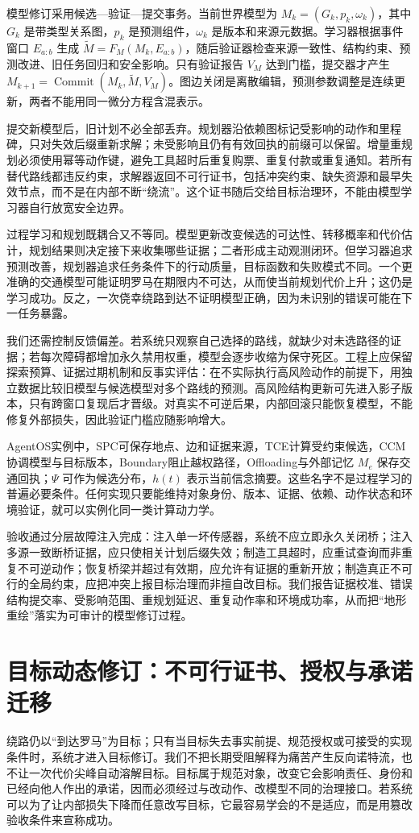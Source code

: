 模型修订采用候选—验证—提交事务。当前世界模型为 $M_k=(G_k,p_k,\omega_k)$，其中 $G_k$ 是带类型关系图，$p_k$ 是预测组件，$\omega_k$ 是版本和来源元数据。学习器根据事件窗口 $E_{a:b}$ 生成 $\widetilde M=F_M(M_k,E_{a:b})$，随后验证器检查来源一致性、结构约束、预测改进、旧任务回归和安全影响。只有验证报告 $V_M$ 达到门槛，提交器才产生 $M_{k+1}=\operatorname{Commit}(M_k,\widetilde M,V_M)$。图边关闭是离散编辑，预测参数调整是连续更新，两者不能用同一微分方程含混表示。

提交新模型后，旧计划不必全部丢弃。规划器沿依赖图标记受影响的动作和里程碑，只对失效后缀重新求解；未受影响且仍有有效回执的前缀可以保留。增量重规划必须使用幂等动作键，避免工具超时后重复购票、重复付款或重复通知。若所有替代路线都违反约束，求解器返回不可行证书，包括冲突约束、缺失资源和最早失效节点，而不是在内部不断“绕流”。这个证书随后交给目标治理环，不能由模型学习器自行放宽安全边界。

过程学习和规划既耦合又不等同。模型更新改变候选的可达性、转移概率和代价估计，规划结果则决定接下来收集哪些证据；二者形成主动观测闭环。但学习器追求预测改善，规划器追求任务条件下的行动质量，目标函数和失败模式不同。一个更准确的交通模型可能证明罗马在期限内不可达，从而使当前规划代价上升；这仍是学习成功。反之，一次侥幸绕路到达不证明模型正确，因为未识别的错误可能在下一任务暴露。

我们还需控制反馈偏差。若系统只观察自己选择的路线，就缺少对未选路径的证据；若每次障碍都增加永久禁用权重，模型会逐步收缩为保守死区。工程上应保留探索预算、证据过期机制和反事实评估：在不实际执行高风险动作的前提下，用独立数据比较旧模型与候选模型对多个路线的预测。高风险结构更新可先进入影子版本，只有跨窗口复现后才晋级。对真实不可逆后果，内部回滚只能恢复模型，不能修复外部损失，因此验证门槛应随影响增大。

AgentOS实例中，SPC可保存地点、边和证据来源，TCE计算受约束候选，CCM协调模型与目标版本，Boundary阻止越权路径，Offloading与外部记忆 $M_e$ 保存交通回执；$\Psi$ 可作为候选分布，$h(t)$ 表示当前信念摘要。这些名字不是过程学习的普遍必要条件。任何实现只要能维持对象身份、版本、证据、依赖、动作状态和环境验证，就可以实例化同一类计算动力学。

验收通过分层故障注入完成：注入单一坏传感器，系统不应立即永久关闭桥；注入多源一致断桥证据，应只使相关计划后缀失效；制造工具超时，应重试查询而非重复不可逆动作；恢复桥梁并超过有效期，应允许有证据的重新开放；制造真正不可行的全局约束，应把冲突上报目标治理而非擅自改目标。我们报告证据校准、错误结构提交率、受影响范围、重规划延迟、重复动作率和环境成功率，从而把“地形重绘”落实为可审计的模型修订过程。

\section{目标动态修订：不可行证书、授权与承诺迁移}
\label{sec:goal_revision_cyme}
绕路仍以“到达罗马”为目标；只有当目标失去事实前提、规范授权或可接受的实现条件时，系统才进入目标修订。我们不把长期受阻解释为痛苦产生反向诺特流，也不让一次代价尖峰自动溶解目标。目标属于规范对象，改变它会影响责任、身份和已经向他人作出的承诺，因而必须经过与改动作、改模型不同的治理接口。若系统可以为了让内部损失下降而任意改写目标，它最容易学会的不是适应，而是用篡改验收条件来宣称成功。

